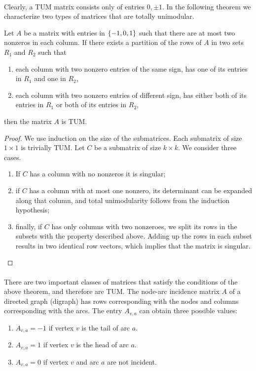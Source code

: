 \paragraph{}
Clearly, a TUM matrix consists only of entries $0,\pm 1$. In the following theorem we characterize two types of matrices that are totally unimodular.
\begin{theorem}
Let $A$ be a matrix with entries in $\left\{ -1, 0, 1 \right\}$ such that there are at most two nonzeros in each column. If there exists a partition of the rows of $A$ in two sets $R_1$ and $R_2$ such that
\begin{enumerate}
 \item each column with two nonzero entries of the same sign, has one of its entries in $R_1$ and one in $R_2$,
 \item each column with two nonzero entries of different sign, has either both of its entries in $R_1$ or both of its entries in $R_2$,
\end{enumerate}
then the matrix $A$ is TUM.
\begin{proof}
We use induction on the size of the submatrices. Each submatrix of size $1\times 1$ is trivially TUM. Let $C$ be a submatrix of size $k\times k$. We consider three cases.
\begin{enumerate}
 \item If $C$ has a column with no nonzeros it is singular;
 \item if $C$ has a column with at most one nonzero, its determinant can be expanded along that column, and total unimodularity follows from the induction hypothesis;
 \item finally, if $C$ has only columns with two nonzeroes, we split its rows in the subsets with the property described above. Adding up the rows in each subset results in two identical row vectors, which implies that the matrix is singular.
\end{enumerate}
\end{proof}
\end{theorem}

\paragraph{}
There are two important classes of matrices that satisfy the conditions of the above theorem, and therefore are TUM. The node-arc incidence matrix $A$ of a directed graph (digraph) has rows corresponding with
the nodes and columns corresponding with the arcs. The entry $A_{v,a}$ can obtain three possible values:
\begin{enumerate}
 \item $A_{v,a}=-1$ if vertex $v$ is the tail of arc $a$.
 \item $A_{v,a}=1$ if vertex $v$ is the head of arc $a$.
 \item $A_{v,a}=0$ if vertex $v$ and arc $a$ are not incident.
\end{enumerate}

